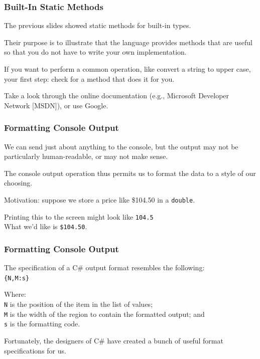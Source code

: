 \begin{frame}
\frametitle{Built-In Static Methods}
The previous slides showed static methods for built-in types.

Their purpose is to illustrate that the language provides methods that are useful so that you do not have to write your own implementation.

If you want to perform a common operation, like convert a string to upper case, your first step: check for a method that does it for you.

Take a look through the online documentation (e.g., Microsoft Developer Network [MSDN]), or use Google.

\end{frame}

\begin{frame}
\frametitle{Formatting Console Output}
We can send just about anything to the console, but the output may not be particularly human-readable, or may not make sense.

The console output operation thus permits us to \alert{format} the data to a style of our choosing.

Motivation: suppose we store a price like \$104.50 in a \texttt{double}.

Printing this to the screen might look like \texttt{104.5}\\
\quad What we'd like is \texttt{\$104.50}.

\end{frame}


\begin{frame}
\frametitle{Formatting Console Output}




The specification of a C\# output format resembles the following:\\
\quad\quad \texttt{\{N,M:s\}}

Where:\\
\quad \texttt{N} is the position of the item in the list of values;\\
\quad \texttt{M} is the width of the region to contain the formatted output; and\\
\quad \texttt{s} is the formatting code.

Fortunately, the designers of C\# have created a bunch of useful format specifications for us.

\end{frame}

